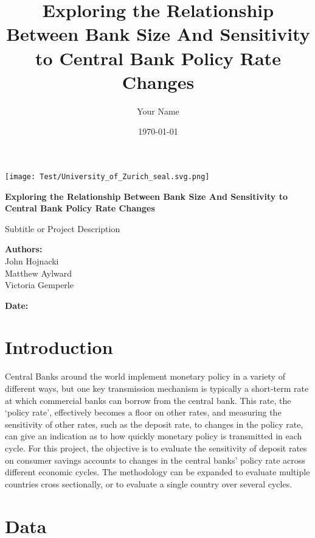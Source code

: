 \documentclass{article}
\title{\textbf{Exploring the Relationship Between Bank Size And Sensitivity to Central Bank Policy Rate Changes}}
\author{Your Name}
\date{\today}
\begin{document}
\begin{titlepage}
    \centering
    \vspace*{-1.5cm} %
    \texttt{[image: Test/University\_of\_Zurich\_seal.svg.png]} %
    
    \vspace{2cm}
    \Huge
    \textbf{Exploring the Relationship Between Bank Size And Sensitivity to Central Bank Policy Rate Changes}
    
    \vspace{1cm}
    \LARGE
    Subtitle or Project Description
    
    \vspace{1cm}
    \textbf{Authors:}\\ John Hojnacki \\ Matthew Aylward \\ Victoria Gemperle
    \vspace{1cm}
    
    \textbf{Date:}\\
    \thedate
    \vfill
    
\end{titlepage}


\section{Introduction}

    \linespread{1}  %
    
Central Banks around the world implement monetary policy in a variety of different ways, but one key transmission mechanism is typically a short-term rate at which commercial banks can borrow from the central bank. This rate, the ‘policy rate’, effectively becomes a floor on other rates, and measuring the sensitivity of other rates, such as the deposit rate, to changes in the policy rate, can give an indication as to how quickly monetary policy is transmitted in each cycle. For this project, the objective is to evaluate the sensitivity of deposit rates on consumer savings accounts to changes in the central banks’ policy rate across different economic cycles. The methodology can be expanded to evaluate multiple countries cross sectionally, or to evaluate a single country over several cycles.

\section{Data}
\end{document}
